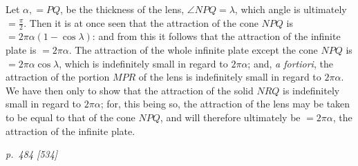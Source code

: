 \documentclass[11pt,a4paper]{article}
\theoremstyle{plain}
\theoremstyle{definition}
\begin{document}
Let $\alpha,=PQ$, be the thickness of the lens, $\angle NPQ=\lambda$, which angle
is ultimately $=\frac{\pi}{2}$. Then it is at once seen that the attraction of the
cone $NPQ$ is $=2\pi\alpha(1-\cos\lambda)$: and from this it follows that the
attraction of the infinite plate is $=2\pi\alpha$. The attraction of the whole infinite
plate except the cone $NPQ$ is $=2\pi\alpha\cos\lambda$, which is indefinitely small
in regard to $2\pi\alpha$; and, \textit{a fortiori}, the attraction of the portion $MPR$
of the lens is indefinitely small in regard to $2\pi\alpha$. We have then only to
show that the attraction of the solid $NRQ$ is indefinitely small in regard to
$2\pi\alpha$; for, this being so, the attraction of the lens may be taken to be equal
to that of the cone $NPQ$, and will therefore ultimately be $=2\pi\alpha$, the
attraction of the infinite plate.

\clearpage

\bigskip
\textit{p.~484 [534]}
\smallskip
\end{document}
